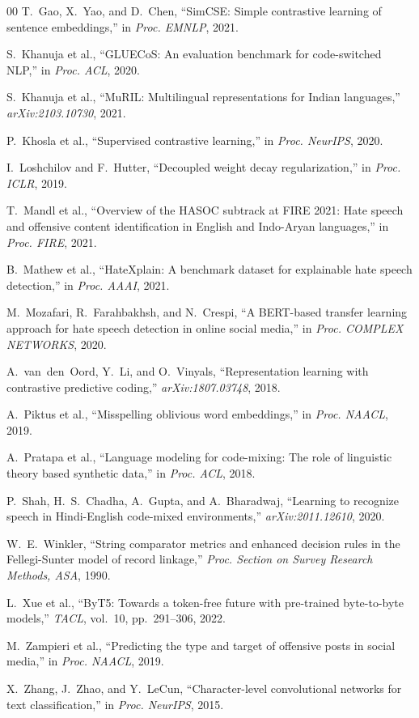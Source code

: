 \documentclass[conference]{IEEEtran}
\begin{document}
\begin{thebibliography}{00}
T.~Gao, X.~Yao, and D.~Chen, ``SimCSE: Simple contrastive learning of sentence embeddings,'' in \textit{Proc. EMNLP}, 2021.

S.~Khanuja et al., ``GLUECoS: An evaluation benchmark for code-switched NLP,'' in \textit{Proc. ACL}, 2020.

S.~Khanuja et al., ``MuRIL: Multilingual representations for Indian languages,'' \textit{arXiv:2103.10730}, 2021.

P.~Khosla et al., ``Supervised contrastive learning,'' in \textit{Proc. NeurIPS}, 2020.

I.~Loshchilov and F.~Hutter, ``Decoupled weight decay regularization,'' in \textit{Proc. ICLR}, 2019.

T.~Mandl et al., ``Overview of the HASOC subtrack at FIRE 2021: Hate speech and offensive content identification in English and Indo-Aryan languages,'' in \textit{Proc. FIRE}, 2021.

B.~Mathew et al., ``HateXplain: A benchmark dataset for explainable hate speech detection,'' in \textit{Proc. AAAI}, 2021.

M.~Mozafari, R.~Farahbakhsh, and N.~Crespi, ``A BERT-based transfer learning approach for hate speech detection in online social media,'' in \textit{Proc. COMPLEX NETWORKS}, 2020.

A.~van~den~Oord, Y.~Li, and O.~Vinyals, ``Representation learning with contrastive predictive coding,'' \textit{arXiv:1807.03748}, 2018.

A.~Piktus et al., ``Misspelling oblivious word embeddings,'' in \textit{Proc. NAACL}, 2019.

A.~Pratapa et al., ``Language modeling for code-mixing: The role of linguistic theory based synthetic data,'' in \textit{Proc. ACL}, 2018.

P.~Shah, H.~S.~Chadha, A.~Gupta, and A.~Bharadwaj, ``Learning to recognize speech in Hindi-English code-mixed environments,'' \textit{arXiv:2011.12610}, 2020.

W.~E.~Winkler, ``String comparator metrics and enhanced decision rules in the Fellegi-Sunter model of record linkage,'' \textit{Proc. Section on Survey Research Methods, ASA}, 1990.

L.~Xue et al., ``ByT5: Towards a token-free future with pre-trained byte-to-byte models,'' \textit{TACL}, vol.~10, pp.~291--306, 2022.

M.~Zampieri et al., ``Predicting the type and target of offensive posts in social media,'' in \textit{Proc. NAACL}, 2019.

X.~Zhang, J.~Zhao, and Y.~LeCun, ``Character-level convolutional networks for text classification,'' in \textit{Proc. NeurIPS}, 2015.

\end{thebibliography}
\end{document}
